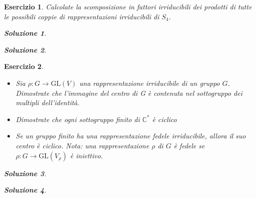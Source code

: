 \documentclass[a4paper]{article}
\theoremstyle{break}
\newtheorem{ex}{{ \Large Esercizio} }
\theoremstyle{plain}
\newtheorem{sol}{Soluzione}[ex]
\begin{document}
\begin{ex}
Calcolate la scomposizione in fattori irriducibili dei prodotti di tutte le possibili coppie di rappresentazioni irriducibili di $S_4$.

\begin{sol}
	
\end{sol}

\begin{sol}

\end{sol}


\end{ex}

\begin{ex}

\begin{itemize}
\item[(a)]  Sia $\rho: G \to \mathrm{GL}(V) $ una rappresentazione irriducibile di un gruppo $G$. Dimostrate che l’immagine del centro di G è contenuta nel sottogruppo dei multipli dell’identità.

\item[(b)] Dimostrate che ogni sottogruppo finito di $\mathbb{C}^*$ è ciclico

\item[(c)] Se un gruppo finito ha una rappresentazione fedele irriducibile, allora il suo centro è ciclico. Nota: una rappresentazione $\rho$ di $G$ è fedele se $\rho: G \to \mathrm{GL}(V_{\rho}) $ è iniettivo.

\end{itemize}
\begin{sol}

\end{sol}

\begin{sol}

\end{sol}


\end{ex}
\end{document}
